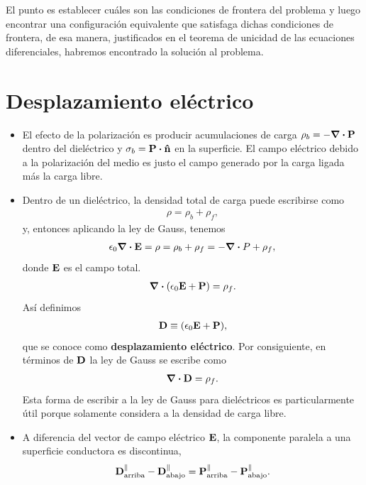 El punto es establecer cuáles son las condiciones de frontera del problema
y luego encontrar una configuración equivalente que satisfaga dichas 
condiciones de frontera, de esa manera, justificados en el teorema de 
unicidad de las ecuaciones diferenciales, habremos encontrado 
la solución al problema. 

\section{Desplazamiento eléctrico}
\begin{itemize}
\item El efecto de la polarización es producir acumulaciones de carga 
$\rho_b=-\div{\vb{P}}$ dentro del dieléctrico y $\sigma_b=\vb{P}
\vdot \vb{\hat{n}}$ en la superficie. El campo eléctrico debido a la
polarización del medio es justo el campo generado 
por la carga ligada más la carga libre. 
\item Dentro de un dieléctrico, la densidad total de carga 
puede escribirse como 
\begin{align}
\rho=\rho_b+\rho_f,
\end{align}
y, entonces aplicando la ley de Gauss, tenemos 
\begin{align}
\epsilon_0 \div{\vb{E}}=\rho=\rho_b+\rho_f=-\div{P}+\rho_f,
\end{align}
donde $\vb{E}$ es el campo total.
\begin{align}
\div{\qty(\epsilon_0\vb{E}+\vb{P})}=\rho_f.
\end{align}
Así definimos
\begin{align}
\vb{D} \equiv \qty(\epsilon_0 \vb{E}+\vb{P}),
\end{align}
que se conoce como \textbf{desplazamiento eléctrico}. Por consiguiente, 
en términos de $\vb{D}$ la ley de Gauss se escribe como
\begin{align}
\div{\vb{D}}=\rho_f.
\end{align}
Esta forma de escribir a la ley de Gauss para dieléctricos es particularmente
útil porque solamente considera a la densidad de carga libre.
\item A diferencia del vector de campo eléctrico $\vb{E}$, la componente
paralela a una superficie conductora es discontinua, 
\begin{align}
\vb{D}^{\parallel}_{\text{arriba}}-\vb{D}^{\parallel}_{\text{abajo}}=
\vb{P}^{\parallel}_{\text{arriba}}-\vb{P}^{\parallel}_{\text{abajo}}.
\end{align}
\end{itemize}

